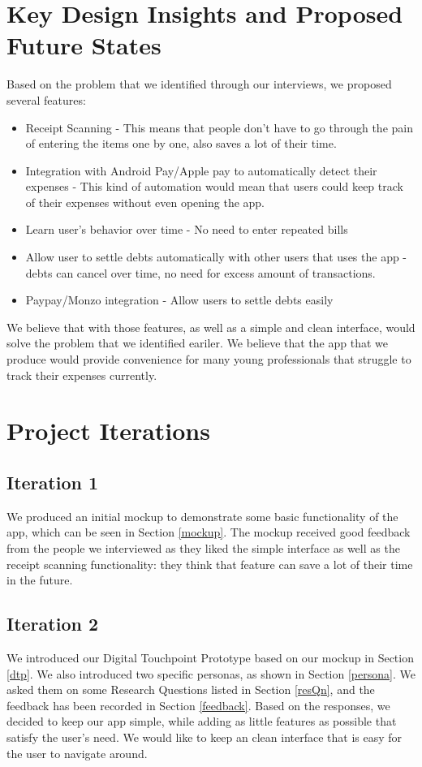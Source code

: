 \documentclass[a4wide, 11pt]{article}
\begin{document}
\section{Key Design Insights and Proposed Future States}

Based on the problem that we identified through our interviews, we proposed several features:
\begin{itemize}
\item Receipt Scanning - This means that people don't have to go through the pain of entering the items one by one, also saves a lot of their time.
\item Integration with Android Pay/Apple pay to automatically detect their expenses - This kind of automation would mean that users could keep track of their expenses without even opening the app.
\item Learn user's behavior over time - No need to enter repeated bills
\item Allow user to settle debts automatically with other users that uses the app - debts can cancel over time, no need for excess amount of transactions.
\item Paypay/Monzo integration - Allow users to settle debts easily
\end{itemize} 

We believe that with those features, as well as a simple and clean interface, would solve the problem that we identified eariler. We believe that the app that we produce would provide convenience for many young professionals that struggle to track their expenses currently.

\section{Project Iterations}

\subsection{Iteration 1}

We produced an initial mockup to demonstrate some basic functionality of the app, which can be seen in Section \ref{mockup}. The mockup received good feedback from the people we interviewed as they liked the simple interface as well as the receipt scanning functionality: they think that feature can save a lot of their time in the future.

\subsection{Iteration 2}
We introduced our Digital Touchpoint Prototype based on our mockup in Section \ref{dtp}. We also introduced two specific personas, as shown in Section \ref{persona}. We asked them on some Research Questions listed in Section \ref{resQn}, and the feedback has been recorded in Section \ref{feedback}. 
Based on the responses, we decided to keep our app simple, while adding as little features as possible that satisfy the user's need. We would like to keep an clean interface that is easy for the user to navigate around.
\end{document}
